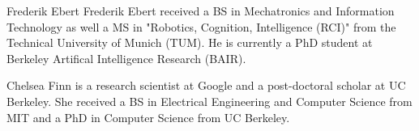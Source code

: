 \documentclass[10pt,journal,compsoc]{IEEEtran}
\begin{document}

%
%
%





% 
\vskip -13mm

\begin{IEEEbiographynophoto}{Frederik Ebert}
Frederik Ebert received a BS in Mechatronics and Information Technology as well a MS in "Robotics, Cognition, Intelligence (RCI)" from the Technical University of Munich (TUM). He is currently a PhD student at Berkeley Artifical Intelligence Research (BAIR). %
\end{IEEEbiographynophoto}
\vskip -13mm

\begin{IEEEbiographynophoto}{Chelsea Finn} is a research scientist at Google and a post-doctoral scholar at UC Berkeley. %
She received a BS in Electrical Engineering and Computer Science from MIT and a PhD in Computer Science from UC Berkeley.
\end{IEEEbiographynophoto}
\vskip -13mm
\end{document}
